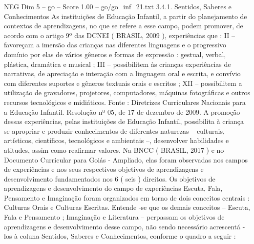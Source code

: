 \begin{textsample}{NEG Dim 5 – go – Score 1.00 – go/go\_inf\_21.txt}  \label{ex:f5_neg_278}
3.4.1.
Sentidos, Saberes e Conhecimentos As instituições de Educação Infantil, a partir do planejamento de contextos de aprendizagens, no que se refere a esse campo, podem promover, de acordo com o artigo 9º das DCNEI ( BRASIL, 2009 ), experiências que : II – favoreçam a imersão das crianças nas diferentes linguagens e o progressivo domínio por elas de vários gêneros e formas de expressão : gestual, verbal, plástica, dramática e musical ; III – possibilitem às crianças experiências de narrativas, de apreciação e interação com a linguagem oral e escrita, e convívio com diferentes suportes e gêneros textuais orais e escritos ; XII – possibilitem a utilização de gravadores, projetores, computadores, máquinas fotográficas e outros recursos tecnológicos e midiáticos.
Fonte : Diretrizes Curriculares Nacionais para a Educação Infantil.
Resolução nº 05, de 17 de dezembro de 2009.
A promoção dessas experiências, pelas instituições de Educação Infantil, possibilita à criança se apropriar e produzir conhecimentos de diferentes naturezas – culturais, artísticos, científicos, tecnológicos e ambientais –, desenvolver habilidades e atitudes, assim como reafirmar valores.
Na BNCC ( BRASIL, 2017 ) e no Documento Curricular para Goiás - Ampliado, elas foram observadas nos campos de experiências e nos seus respectivos objetivos de aprendizagens e desenvolvimento fundamentados nos 6 ( seis ) direitos.
Os objetivos de aprendizagens e desenvolvimento do campo de experiências Escuta, Fala, Pensamento e Imaginação foram organizados em torno de dois conceitos centrais : Culturas Orais e Culturas Escritas.
Entende -se que os demais conceitos – Escuta, Fala e Pensamento ; Imaginação e Literatura – perpassam os objetivos de aprendizagens e desenvolvimento desse campo, não sendo necessário acrescentá -los à coluna Sentidos, Saberes e Conhecimentos, conforme o quadro a seguir :

\end{textsample}
